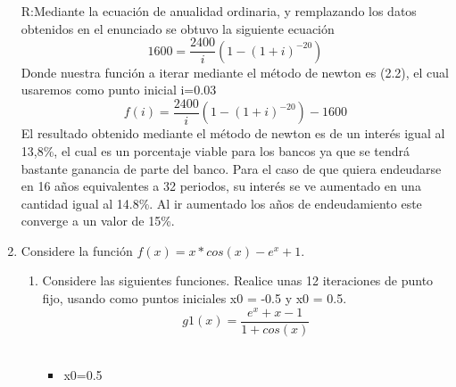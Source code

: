 \documentclass{udpreport}
\begin{document}
\begin{enumerate}
R:Mediante la ecuación de anualidad ordinaria, y remplazando  los datos obtenidos en el enunciado se obtuvo la siguiente ecuación
\begin{equation}
    1600=\frac{2400}{i}\left(1-\left(1+i\right)^{-20}\right)
\end{equation}
Donde nuestra función a iterar mediante el método de newton es (2.2), el cual usaremos como punto inicial i=0.03
\begin{equation}
    f(i)=\frac{2400}{i}\left(1-\left(1+i\right)^{-20}\right)-1600
\end{equation}
El resultado obtenido mediante el método de newton es de un interés igual al 13,8\%, el cual es un porcentaje viable para los bancos ya que se tendrá bastante ganancia de parte del banco. Para el caso de que quiera endeudarse en 16 años equivalentes a 32 periodos, su interés se ve aumentado en una cantidad igual al 14.8\%. Al ir aumentado los años de endeudamiento este converge a un valor de 15\%.\par



\item Considere la función \(f(x) = x*cos(x)-e^x+ 1\). %
\begin{enumerate}
    
\vspace{0.9cm}
\item Considere las siguientes funciones. Realice unas 12 iteraciones de punto fijo, usando como puntos iniciales x0 = -0.5 y x0 = 0.5.\\ 


\begin{equation}
 g1(x) = \frac{e^x+x-1}
{1 + cos(x)}
\end{equation}
\\
\begin{itemize}
\item x0=0.5
\end{itemize}


\begin{table}[H]
    \centering
        \begin{tabular} { |c|c|}
        

\end{tabular}
\end{table}
\end{enumerate}
\end{enumerate}
\end{document}
